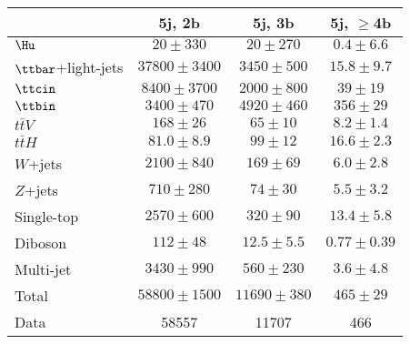 \begin{table}[htbp]
\begin{center}
\begin{tabular}{l*{3}{c}}
\hline\hline
 & 5j, 2b & 5j, 3b & 5j, $\geq$4b \\
\hline
$\Hu$  &   $ 20 \pm 330 $ &   $ 20 \pm 270 $ &   $ 0.4 \pm 6.6 $ \\ 
\hline
$\ttbar$+light-jets  &   $ 37800 \pm 3400 $ &   $ 3450 \pm 500 $ &   $ 15.8 \pm 9.7 $ \\ 
$\ttcin$  &   $ 8400 \pm 3700 $ &   $ 2000 \pm 800 $ &   $ 39 \pm 19 $ \\ 
$\ttbin$  &   $ 3400 \pm 470 $ &   $ 4920 \pm 460 $ &   $ 356 \pm 29 $ \\ 
$t\bar{t}V$  &   $ 168 \pm 26 $ &   $ 65 \pm 10 $ &   $ 8.2 \pm 1.4 $ \\ 
$t\bar{t}H$  &   $ 81.0 \pm 8.9 $ &   $ 99 \pm 12 $ &   $ 16.6 \pm 2.3 $ \\ 
$W$+jets  &   $ 2100 \pm 840 $ &   $ 169 \pm 69 $ &   $ 6.0 \pm 2.8 $ \\ 
$Z$+jets  &   $ 710 \pm 280 $ &   $ 74 \pm 30 $ &   $ 5.5 \pm 3.2 $ \\ 
Single-top  &   $ 2570 \pm 600 $ &   $ 320 \pm 90 $ &   $ 13.4 \pm 5.8 $ \\ 
Diboson  &   $ 112 \pm 48 $ &   $ 12.5 \pm 5.5 $ &   $ 0.77 \pm 0.39 $ \\ 
Multi-jet  &   $ 3430 \pm 990 $ &   $ 560 \pm 230 $ &   $ 3.6 \pm 4.8 $ \\ 
\hline
Total &   $ 58800 \pm 1500 $ &   $ 11690 \pm 380 $ &   $ 465 \pm 29 $ \\ 
\hline
Data & 58557  & 11707  & 466  \\ 
\hline\hline      
\end{tabular}
\vspace{0.2cm}


\end{center}
\end{table}
